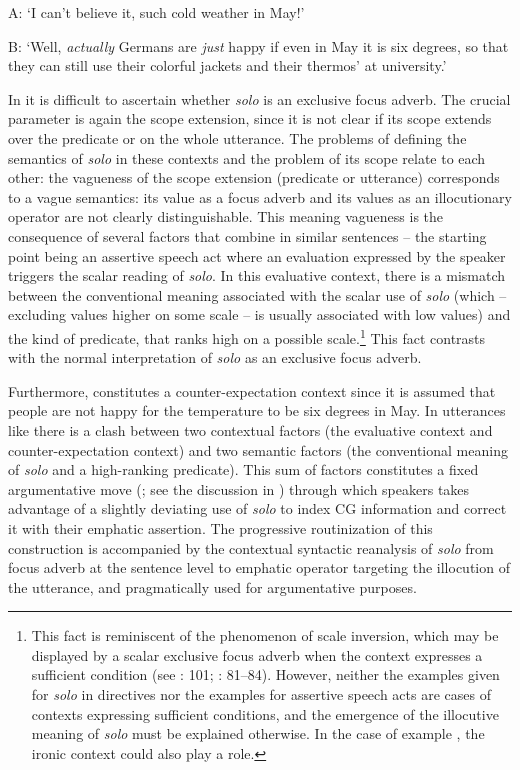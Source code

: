 \glt
  A:  ‘I can’t believe it, such cold weather in May!’

B:  ‘Well, \textit{actually} Germans are \textit{just} happy if even in May it is six degrees, so that they can still use their colorful jackets and their thermos’ at university.’
    \z %

In  it is difficult to ascertain whether \textit{solo} is an exclusive focus adverb. The crucial parameter is again the scope extension, since it is not clear if its scope extends over the predicate or on the whole utterance. The problems of defining the semantics of \textit{solo} in these contexts and the problem of its scope relate to each other: the vagueness of the scope extension (predicate or utterance) corresponds to a vague semantics: its value as a focus adverb and its values as an illocutionary operator are not clearly distinguishable. This meaning vagueness is the consequence of several factors that combine in similar sentences – the starting point being an assertive speech act where an evaluation expressed by the speaker triggers the scalar reading of \textit{solo}. In this evaluative context, there is a mismatch between the conventional meaning associated with the scalar use of \textit{solo} (which – excluding values higher on some scale – is usually associated with low values) and the kind of predicate, that ranks high on a possible scale.\footnote{This fact is reminiscent of the phenomenon of scale inversion, which may be displayed by a scalar exclusive focus adverb when the context expresses a sufficient condition (see \citealt{König1991}: 101; \citealt{ModicomDuplâtre2018}: 81–84). However, neither the examples given for \textit{solo} in directives nor the examples for assertive speech acts are cases of contexts expressing sufficient conditions, and the emergence of the illocutive meaning of \textit{solo} must be explained otherwise. In the case of example , the ironic context could also play a role.} This fact contrasts with the normal interpretation of \textit{solo} as an exclusive focus adverb.

Furthermore,  constitutes a counter-expectation context since it is assumed that people are not happy for the temperature to be six degrees in May. In utterances like  there is a clash between two contextual factors (the evaluative context and counter-expectation context) and two semantic factors (the conventional meaning of \textit{solo} and a high-ranking predicate). This sum of factors constitutes a fixed argumentative move (\citealt{DetgesWaltereit2016}; see the discussion in ) through which speakers takes advantage of a slightly deviating use of \textit{solo} to index CG information and correct it with their emphatic assertion. The progressive routinization of this construction is accompanied by the contextual syntactic reanalysis of \textit{solo} from focus adverb at the sentence level to emphatic operator targeting the illocution of the utterance, and pragmatically used for argumentative purposes.

